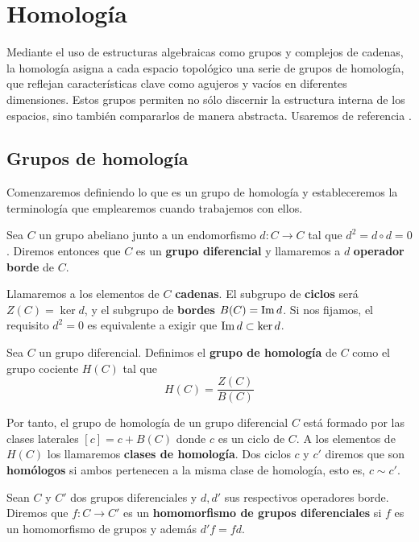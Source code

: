 
\chapter{Homología}

Mediante el uso de estructuras algebraicas como grupos y complejos de cadenas, la homología asigna a cada espacio topológico una serie de grupos de homología, que reflejan características clave como agujeros y vacíos en diferentes dimensiones. Estos grupos permiten no sólo discernir la estructura interna de los espacios, sino también compararlos de manera abstracta. Usaremos de referencia \cite{maclane2012homology}.

\section{Grupos de homología}

Comenzaremos definiendo lo que es un grupo de homología y estableceremos la terminología que emplearemos cuando trabajemos con ellos.

\begin{definicion}
	Sea $C$ un grupo abeliano junto a un endomorfismo  $d: C \rightarrow C$ tal que $d^2 = d \circ d = 0$. Diremos entonces que $C$ es un \textbf{grupo diferencial} y llamaremos a $d$ \textbf{operador borde} de $C$.
\end{definicion}

Llamaremos a los elementos de $C$ \textbf{cadenas}. El subgrupo de \textbf{ciclos} será $Z(C) = \ker d$,  y el subgrupo de \textbf{bordes} $B(C) = \operatorname{Im} d$. Si nos fijamos, el requisito $d^2 = 0$ es equivalente a exigir que $\operatorname{Im}{d} \subset \ker{d}$.

\begin{definicion}
	Sea $C$ un grupo diferencial. Definimos el \textbf{grupo de homología} de $C$ como el grupo cociente $H(C)$ tal que 
	\[ H(C) = \frac{Z(C)}{B(C)}\]
\end{definicion}

Por tanto, el grupo de homología de un grupo diferencial $C$ está formado por las clases laterales $[c] = c + B(C)$ donde $c$ es un ciclo de $C$. A los elementos de $H(C)$ los llamaremos \textbf{clases de homología}. Dos ciclos $c$ y $c'$ diremos que son \textbf{homólogos} si ambos pertenecen a la misma clase de homología, esto es, $c \sim c'$.

\begin{definicion}
	Sean $C$ y $C'$ dos grupos diferenciales y $d, d'$ sus respectivos operadores borde. Diremos que $f: C \rightarrow C'$ es un \textbf{homomorfismo de grupos diferenciales} si $f$ es un homomorfismo de grupos y además $d'f = fd$.
\end{definicion}

